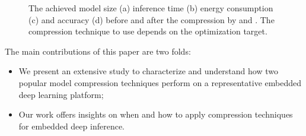 \begin{figure}[!t]
\centering
{}
\hfill
{}
\hfill
{}
\hfill
{}
\hfill
\caption{The achieved model size (a) inference time (b) energy consumption (c) and accuracy (d) before and after the compression by \quantization and \pruning.
The compression technique to use depends on the optimization target.}
\label{fig:motivation}
\end{figure}


The main contributions of this paper are two folds:

\begin{itemize}
\item We present an extensive study to characterize and understand how two popular model compression techniques perform on a
    representative embedded deep learning platform;
\item Our work offers insights on when and how to apply compression techniques for embedded deep inference.
\end{itemize}
